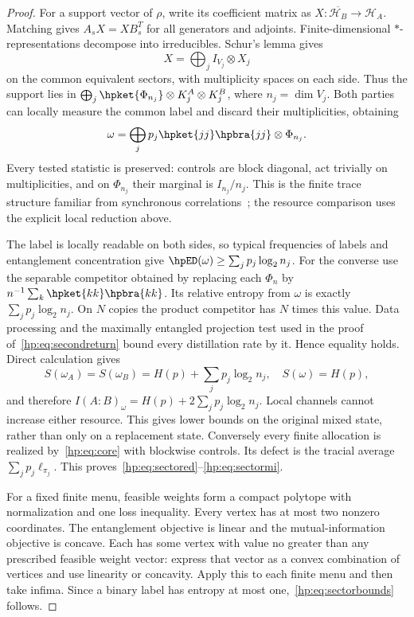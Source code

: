 \begin{proof}
For a support vector of $\rho$, write its coefficient matrix as $X:\overline{\mathcal H_B}\to\mathcal H_A$. Matching gives $A_sX=XB_s^T$ for all generators and adjoints. Finite-dimensional $*$-representations decompose into irreducibles. Schur's lemma gives
\[
 X=\bigoplus_j I_{V_j}\otimes X_j
\]
on the common equivalent sectors, with multiplicity spaces on each side. Thus the support lies in $\bigoplus_j\hpket{\Phi_{n_j}}\otimes K_j^A\otimes K_j^B$, where $n_j=\dim V_j$. Both parties can locally measure the common label and discard their multiplicities, obtaining
\begin{equation}
 \omega=\bigoplus_jp_j\hpket{jj}\hpbra{jj}\otimes\Phi_{n_j}.\label{hp:eq:core}
\end{equation}
Every tested statistic is preserved: controls are block diagonal, act trivially on multiplicities, and on $\Phi_{n_j}$ their marginal is $I_{n_j}/n_j$. This is the finite trace structure familiar from synchronous correlations~\cite{HPpsstw}; the resource comparison uses the explicit local reduction above.

The label is locally readable on both sides, so typical frequencies of labels and entanglement concentration give $\hpED(\omega)\ge\sum_jp_j\log_2n_j$. For the converse use the separable competitor obtained by replacing each $\Phi_n$ by $n^{-1}\sum_k\hpket{kk}\hpbra{kk}$. Its relative entropy from $\omega$ is exactly $\sum_jp_j\log_2n_j$. On $N$ copies the product competitor has $N$ times this value. Data processing and the maximally entangled projection test used in the proof of~\eqref{hp:eq:secondreturn} bound every distillation rate by it. Hence equality holds. Direct calculation gives
\[
 S(\omega_A)=S(\omega_B)=H(p)+\sum_jp_j\log_2n_j,\quad S(\omega)=H(p),
\]
and therefore $I(A:B)_\omega=H(p)+2\sum_jp_j\log_2n_j$. Local channels cannot increase either resource. This gives lower bounds on the original mixed state, rather than only on a replacement state. Conversely every finite allocation is realized by~\eqref{hp:eq:core} with blockwise controls. Its defect is the tracial average $\sum_jp_j\ell_{\pi_j}$. This proves~\eqref{hp:eq:sectored}--\eqref{hp:eq:sectormi}.

For a fixed finite menu, feasible weights form a compact polytope with normalization and one loss inequality. Every vertex has at most two nonzero coordinates. The entanglement objective is linear and the mutual-information objective is concave. Each has some vertex with value no greater than any prescribed feasible weight vector: express that vector as a convex combination of vertices and use linearity or concavity. Apply this to each finite menu and then take infima. Since a binary label has entropy at most one,~\eqref{hp:eq:sectorbounds} follows.


\end{proof}
